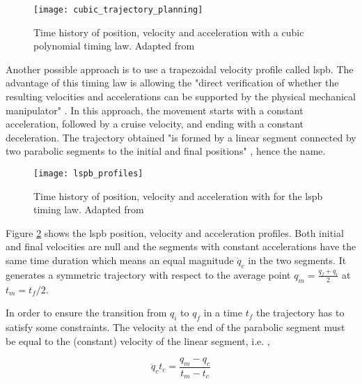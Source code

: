 \begin{figure}[htbp]
	\centering
	\texttt{[image: cubic\_trajectory\_planning]}
	\caption{Time history of position, velocity and acceleration with a cubic polynomial timing law. Adapted from \cite{Siciliano2009_robotics_modelling_planning_control}}
	\label{fig:cubic_trajectory_planning}
\end{figure}

Another possible approach is to use a trapezoidal velocity profile called \gls{lspb}. The advantage of this timing law is allowing the "direct verification of whether the resulting velocities and accelerations can be supported by the physical mechanical manipulator" \cite{Siciliano2009_robotics_modelling_planning_control}. In this approach, the movement starts with a constant acceleration, followed by a cruise velocity, and ending with a constant deceleration. The trajectory obtained "is formed by a linear segment connected by two parabolic segments to the initial and final positions" \cite{Siciliano2009_robotics_modelling_planning_control}, hence the name.\\

\begin{figure}[htbp]
	\centering
	\texttt{[image: lspb\_profiles]}
	\caption{Time history of position, velocity and acceleration with for the \gls{lspb} timing law. Adapted from \cite{Siciliano2009_robotics_modelling_planning_control}}
	\label{fig:lspb_profiles}
\end{figure}

Figure \ref{fig:lspb_profiles} shows the \gls{lspb} position, velocity and acceleration profiles. Both initial and final velocities are null and the segments with constant accelerations have the same time duration which means an equal magnitude $\ddot{q}_c$ in the two segments. It generates a symmetric trajectory with respect to the average point $q_m = \frac{q_f + q_i}{2}$ at $t_m = t_f / 2$.

In order to ensure the transition from $q_i$ to $q_f$ in a time $t_f$ the trajectory has to satisfy some constraints. The velocity at the end of the parabolic segment must be equal to the (constant) velocity of the linear segment, i.e. \cite{Siciliano2009_robotics_modelling_planning_control},

\begin{equation}
    \label{eq:lspb_qctc}
    \ddot{q}_c t_c = \frac{q_m - q_c}{t_m - t_c}
\end{equation}

